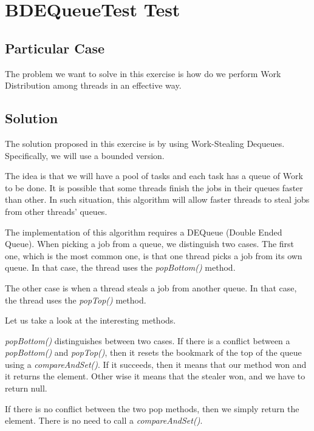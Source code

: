 \section{\textbf{BDEQueueTest Test}}
\subsection{Particular Case}
\par
The problem we want to solve in this exercise is how do we perform Work
Distribution among threads in an effective way.
\par
\subsection{Solution}
\par
The solution proposed in this exercise is by using Work-Stealing Dequeues.
Specifically, we will use a bounded version.
\par
The idea is that we will have a pool of tasks and each task has a queue of Work
to be done. It is possible that some threads finish the jobs in their queues
faster than other. In such situation, this algorithm will allow faster threads
to steal jobs from other threads' queues. 
\par
The implementation of this algorithm requires a DEQueue (Double Ended Queue).
When picking a job from a queue, we distinguish two cases. The first one, which
is the most common one, is that one thread picks a job from its own queue. In
that case, the thread uses the \textit{popBottom()} method.
\par
The other case is when a thread steals a job from another queue. In that case,
the thread uses the \textit{popTop()} method.
\par
Let us take a look at the interesting methods.
\par
\textit{popBottom()} distinguishes between two cases. If there is a conflict
between a \textit{popBottom()} and \textit{popTop()}, then it resets the
bookmark of the top of the queue using a \textit{compareAndSet()}. If it
succeeds, then it means that our method won and it returns the element. Other
wise it means that the stealer won, and we have to return null.
\par
If there is no conflict between the two pop methods, then we simply return the
element. There is no need to call a \textit{compareAndSet()}.
